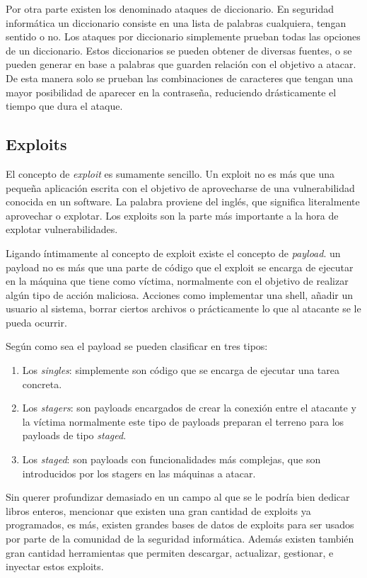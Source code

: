 Por otra parte existen los denominado ataques de diccionario. En seguridad informática un diccionario consiste en una lista de palabras cualquiera, tengan sentido o no. Los ataques por diccionario simplemente prueban todas las opciones de un diccionario. Estos diccionarios se pueden obtener de diversas fuentes, o se pueden generar en base a palabras que guarden relación con el objetivo a atacar. De esta manera solo se prueban las combinaciones de caracteres que tengan una mayor posibilidad de aparecer en la contraseña, reduciendo drásticamente el tiempo que dura el ataque.

\subsection{Exploits}

El concepto de \emph{exploit} es sumamente sencillo. Un exploit no es más que una pequeña aplicación escrita con el objetivo de aprovecharse de una vulnerabilidad conocida en un software. La palabra proviene del inglés, que significa literalmente aprovechar o explotar. Los exploits son la parte más importante a la hora de explotar vulnerabilidades.

Ligando íntimamente al concepto de exploit existe el concepto de \emph{payload}. un payload no es más que una parte de código que el exploit se encarga de ejecutar en la máquina que tiene como víctima, normalmente con el objetivo de realizar algún tipo de acción maliciosa. Acciones como implementar una shell, añadir un usuario al sistema, borrar ciertos archivos o prácticamente lo que al atacante se le pueda ocurrir.

Según como sea el payload se pueden clasificar en tres tipos:
\begin{enumerate}
	\item Los \emph{singles}: simplemente son código que se encarga de ejecutar una tarea concreta.
	\item Los \emph{stagers}: son payloads encargados de crear la conexión entre el atacante y la víctima normalmente este tipo de payloads preparan el terreno para los payloads de tipo \textit{staged}.
	\item Los \emph{staged}: son payloads con funcionalidades más complejas, que son introducidos por los stagers en las máquinas a atacar.
\end{enumerate}

Sin querer profundizar demasiado en un campo al que se le podría bien dedicar libros enteros, mencionar que existen una gran cantidad de exploits ya programados, es más, existen grandes bases de datos de exploits para ser usados por parte de la comunidad de la seguridad informática. Además existen también gran cantidad herramientas que permiten descargar, actualizar, gestionar, e inyectar estos exploits.


